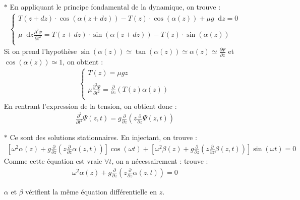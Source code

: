 \documentclass{report}
\newcommand*\dif{\mathop{}\!\mathrm{d}}
\begin{document}
\begin{itemize}

	\item[$\ast$] En appliquant le principe fondamental de la dynamique, on trouve :
	\begin{align*}
	\left\lbrace
	\begin{array}{ccc}
	T(z+dz)\cdot\cos(\alpha(z+dz))-T(z)\cdot\cos(\alpha(z))+\mu g\dif z=0\\
	\\
	\mu\dif z\frac{\partial^2\Psi}{\partial t^2}=T(z+dz)\cdot\sin(\alpha(z+dz))-T(z)\cdot\sin(\alpha(z))\\
	\end{array}\right.
	\end{align*}		
	Si on prend l'hypothèse $\sin(\alpha(z))\simeq\tan(\alpha(z))\simeq\alpha(z)\simeq\frac{\partial \Psi}{\partial z}$ et $\cos(\alpha(z))\simeq1$, on obtient :
	\begin{align*}
	\left\lbrace
	\begin{array}{ccc}
	T(z)=\mu gz\\
	\\
	\mu\frac{\partial^2\Psi}{\partial t^2}=\frac{\partial}{\partial z}(T(z)\alpha(z))\\
	\end{array}\right.
	\end{align*}		
	En rentrant l'expression de la tension, on obtient donc :
	\begin{align*}
		\frac{\partial^2}{\partial t^2}\Psi(z,t)=g\frac{\partial}{\partial z}\left( z\frac{\partial}{\partial z}\Psi(z,t)\right) 
	\end{align*}
	
		\item[$\ast$] Ce sont des solutions stationnaires. En injectant, on trouve :
		\begin{align*}
			\left[ \omega^2\alpha(z)+g\frac{\partial}{\partial z}\left( z\frac{\partial}{\partial z}\alpha(z,t)\right)\right] \cos(\omega t)+\left[ \omega^2\beta(z)+g\frac{\partial}{\partial z}\left( z\frac{\partial}{\partial z}\beta(z,t)\right)\right] \sin(\omega t)=0
		\end{align*}
		Comme cette équation est vraie $\forall t$, on a nécessairement :
trouve :
		\begin{align*}
			\omega^2\alpha(z)+g\frac{\partial}{\partial z}\left( z\frac{\partial}{\partial z}\alpha(z,t)\right)=0
		\end{align*}		
		
		$\alpha$ et $\beta$ vérifient la même équation différentielle en $z$.
		

\end{itemize}
\end{document}
